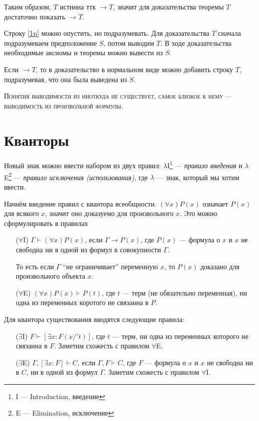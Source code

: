 Таким образом, $T$ истинна ттк $\to T$, значит для доказательства теоремы $T$
достаточно показать $\to T$.

Строку \ref{1p} можно опустить, но подразумевать.
Для доказательства $T$ сначала подразумеваем предположение $S$, потом
выводим $T$. В ходе доказательства необходимые
аксиомы и теоремы можно вывести из $S$.

Если $\to T$, то в доказательство в нормальном виде
можно добавить строку $T$, подразумевая, что она была выведена из $S$.

\textsc{Понятия выводимости из ниоткуда не существует,
  самое близкое к нему --- выводимость из произвольной формулы.}

\section{Кванторы}

\newcommand\Aii{$\forall$I}
\newcommand\Aee{$\forall$E}
\newcommand\Eii{$\exists$I}
\newcommand\Eee{$\exists$E}

Новый знак можно ввести набором из двух правил:
$\lambda$I\footnote{I --- Introduction, введение} --- {\it правило введения}
и $\lambda$E\footnote{E --- Elimination, исключение} --- {\it правило
исключения (использования)},
где $\lambda$ --- знак, который мы хотим ввести.

Начнём введение правил с квантора всеобщности. $(\forall x)P(x)$ означает
$P(x)$ для всякого $x$, значит оно доказуемо для произвольного $x$.
Это можно сформулировать в правилах
\begin{enumerate}
  \item[(\Aii{})]{}$\Gamma\vdash(\forall x)P(x)$, если ${\Gamma\to P(x)}$, где
  $P(x)$ --- формула о $x$ и $x$ не свободна ни в одной из формул
  в совокупности $\Gamma$.\index{правило!\Aii}

  То есть если $\Gamma$ ``не ограничивает'' переменную $x$,
  то $P(x)$ доказано для произвольного объекта $x$.

  \item[(\Aee{})]{}$(\forall x)P(x)\vdash P(t)$, где $t$ --- терм
  (не обязательно переменная), ни одна из переменных коротого не связанна в $P$.
  \index{правило!\Aee}
\end{enumerate}

Для квантора существования вводятся следующие правила:
\begin{enumerate}
  \item[(\Eii{})]${F\vdash [\exists x:F(x/'t)]}$, где $t$ --- терм,
  ни одна из переменных которого не связанна в $F$.
  Заметим схожесть с правилом $\forall$E.
  \index{правило!\Eii}

  \item[(\Eee{})]${\Gamma, [\exists x:F]\vdash C}$, если $\Gamma, F\vdash C$,
  где $F$ --- формула о $x$ и $x$ не свободна ни в $C$, ни в одной из формул $\Gamma$.
  Заметим схожесть с правилом $\forall$I.
  \index{правило!\Eee}
\end{enumerate}

